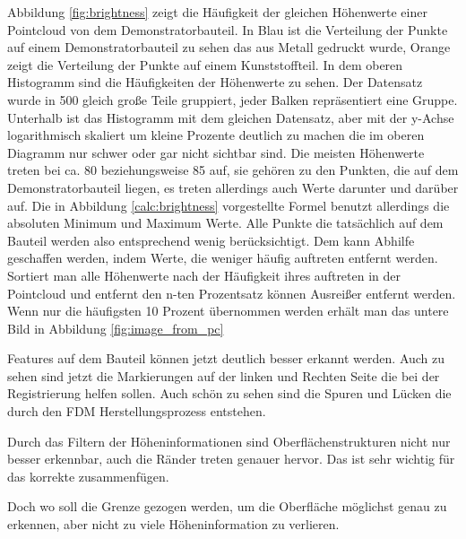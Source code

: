 \documentclass[../main.tex]{subfiles}
\begin{document}
Abbildung \ref*{fig:brightness} zeigt die Häufigkeit der gleichen Höhenwerte einer
Pointcloud von dem Demonstratorbauteil. In Blau ist die Verteilung der Punkte auf 
einem Demonstratorbauteil zu sehen das aus Metall gedruckt wurde, Orange zeigt die 
Verteilung der Punkte auf einem Kunststoffteil.
In dem oberen Histogramm 
sind die Häufigkeiten der Höhenwerte zu sehen. Der Datensatz wurde in 500 gleich große
Teile gruppiert, jeder Balken repräsentiert eine Gruppe.
Unterhalb ist das Histogramm mit dem gleichen Datensatz, aber mit der y-Achse 
logarithmisch skaliert um kleine Prozente deutlich zu machen die im
oberen Diagramm nur schwer oder gar nicht sichtbar sind. 
Die meisten Höhenwerte treten bei ca. 80 beziehungsweise 85 auf, 
sie gehören zu den Punkten, die auf dem Demonstratorbauteil liegen, 
es treten allerdings auch Werte darunter und darüber auf. 
Die in Abbildung \ref*{calc:brightness} vorgestellte Formel benutzt allerdings 
die absoluten Minimum und Maximum Werte.
Alle Punkte die tatsächlich auf dem Bauteil werden also entsprechend wenig
berücksichtigt. Dem kann Abhilfe geschaffen werden, indem Werte, die weniger häufig 
auftreten entfernt werden. Sortiert man alle Höhenwerte nach der Häufigkeit ihres 
auftreten in der Pointcloud und entfernt den n-ten Prozentsatz können Ausreißer 
entfernt werden. Wenn nur die häufigsten 10 Prozent übernommen werden erhält man 
das untere Bild in Abbildung \ref{fig:image_from_pc}

Features auf dem Bauteil können jetzt deutlich besser erkannt werden. Auch zu sehen
sind jetzt die Markierungen auf der linken und Rechten Seite die bei der Registrierung
helfen sollen. Auch schön zu sehen sind die Spuren und Lücken die durch den FDM 
Herstellungsprozess entstehen.

Durch das Filtern der Höheninformationen sind Oberflächenstrukturen nicht nur besser
erkennbar, auch die Ränder treten genauer hervor. Das ist sehr wichtig für das korrekte
zusammenfügen.

Doch wo soll die Grenze gezogen werden, um die Oberfläche möglichst genau zu erkennen,
aber nicht zu viele Höheninformation zu verlieren.
\end{document}
